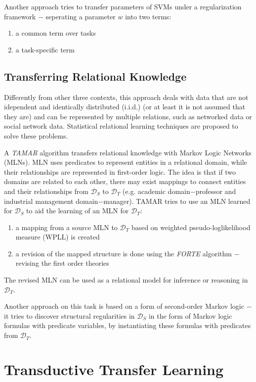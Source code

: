 \documentclass[a4paper,twocolumn]{article}
\newcommand{\D}{\mathcal{D}}
\begin{document}
Another approach tries to transfer parameters of SVMs under a regularization framework $-$ seperating a parameter $w$ into two terms:
\begin{enumerate}
    \item a common term over tasks
    \item a task-specific term
\end{enumerate}

\subsection{Transferring Relational Knowledge}
Differently from other three contexts, this approach deals with data that are not idependent and identically distributed (i.i.d.) (or at least it is not assumed that they are) and can be represented by multiple relations, such as networked data or social network data. Statistical relational learning techniques are proposed to solve these problems.

A \textit{TAMAR} algorithm transfers relational knowledge with Markov Logic Networks (MLNs). MLN uses predicates to represent entities in a relational domain, while their relationships are represented in first-order logic. The idea is that if two domains are related to each other, there may exist mappings to connect entities and their relationships from $\D_S$ to $\D_T$ (e.g. academic domain$-$professor and industrial management domain$-$manager). TAMAR tries to use an MLN learned for $\D_S$ to aid the learning of an MLN for $\D_T$:
\begin{enumerate}
    \item a mapping from a source MLN to $\D_T$ based on weighted pseudo-loglikelihood measure (WPLL) is created
    \item a revision of the mapped structure is done using the \textit{FORTE} algorithm $-$ revising the first order theories
\end{enumerate}
The revised MLN can be used as a relational model for inference or reasoning in $\D_T$.

Another approach on this task is based on a form of second-order Markov logic $-$ it tries to discover structural regularities in $\D_S$ in the form of Markov logic formulas with predicate variables, by instantiating these formulas with predicates from $\D_T$.

\section{Transductive Transfer Learning}
\end{document}
